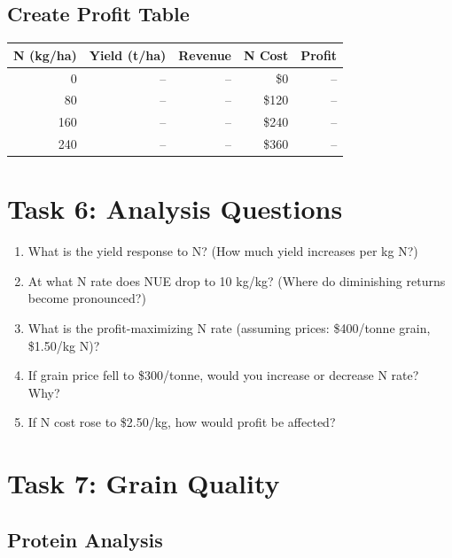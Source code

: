 \subsection{Create Profit Table}

\begin{table}[H]
\centering
\begin{tabularx}{\textwidth}{r|r|r|r|r}
\toprule
\textbf{N (kg/ha)} & \textbf{Yield (t/ha)} & \textbf{Revenue} & \textbf{N Cost} & \textbf{Profit} \\
\midrule
0 & -- & -- & \$0 & -- \\
80 & -- & -- & \$120 & -- \\
160 & -- & -- & \$240 & -- \\
240 & -- & -- & \$360 & -- \\
\bottomrule
\end{tabularx}
\end{table}

\section{Task 6: Analysis Questions}

\begin{enumerate}
  \item What is the yield response to N? (How much yield increases per kg N?)
  
  \item At what N rate does NUE drop to 10 kg/kg? (Where do diminishing returns become pronounced?)
  
  \item What is the profit-maximizing N rate (assuming prices: \$400/tonne grain, \$1.50/kg N)?
  
  \item If grain price fell to \$300/tonne, would you increase or decrease N rate? Why?
  
  \item If N cost rose to \$2.50/kg, how would profit be affected?
\end{enumerate}

\section{Task 7: Grain Quality}

\subsection{Protein Analysis}

